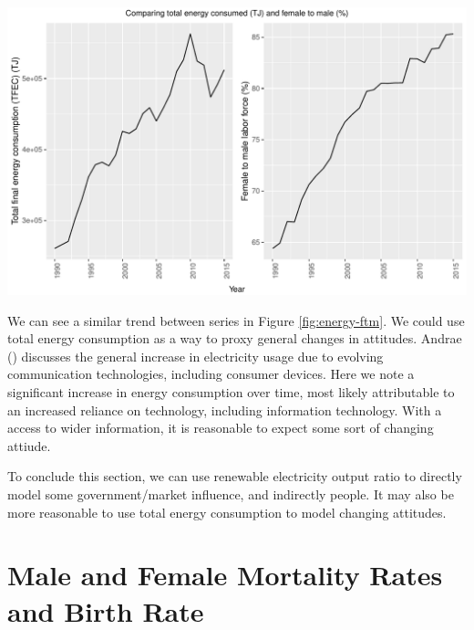 \documentclass[11pt,a4paper,]{article}
\let\origfigure\figure
\let\endorigfigure\endfigure
\renewenvironment{figure}[1][2] {
    \expandafter\origfigure\expandafter[H]
} {
    \endorigfigure
}%
\begin{document}
\begin{figure}
\centering
\includegraphics{report_files/figure-latex/energy-ftm-1.pdf}
\caption{\label{fig:energy-ftm}Comparing total energy consumption and female to male ratio.}
\end{figure}

We can see a similar trend between series in Figure \ref{fig:energy-ftm}. We could use total energy consumption as a way to proxy general changes in attitudes. Andrae (\textcite{Andrae2015}) discusses the general increase in electricity usage due to evolving communication technologies, including consumer devices. Here we note a significant increase in energy consumption over time, most likely attributable to an increased reliance on technology, including information technology. With a access to wider information, it is reasonable to expect some sort of changing attiude.

To conclude this section, we can use renewable electricity output ratio to directly model some government/market influence, and indirectly people. It may also be more reasonable to use total energy consumption to model changing attitudes.

\section*{Male and Female Mortality Rates and Birth Rate}
\end{document}

